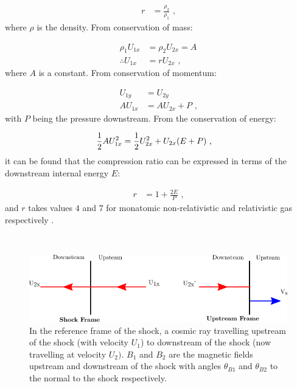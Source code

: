 \begin{equation}
    \begin{aligned}
        r&=\frac{\rho_2}{\rho_1}\text{ ,}
    \end{aligned}
\end{equation}
\noindent where $\rho$ is the density. From conservation of mass:

\begin{equation}
    \begin{aligned}
        \rho_1U_{1x}&=\rho_2U_{2x}=A \\
        \therefore U_{1x}&=rU_{2x}\text{ ,}
    \end{aligned} \label{eq:A3_velocity_ratios}
\end{equation}
\noindent where $A$ is a constant. From conservation of momentum:

\begin{subequations}
    \begin{alignat}{1}
        U_{1y}&=U_{2y} \\
        AU_{1x}&=AU_{2x}+P\text{ ,}
    \end{alignat}
\end{subequations}
\noindent with $P$ being the pressure downstream. From the conservation of energy:

\begin{equation}
    \begin{aligned}
        \frac{1}{2}AU_{1x}^2&=\frac{1}{2}U_{2x}^2+U_{2x}\qty(E+P)\text{ ,}
    \end{aligned}
\end{equation}
\noindent it can be found that the compression ratio can be expressed in terms of the downstream internal energy $E$:

\begin{equation}
    \begin{aligned}
        r&=1+\frac{2E}{P}\text{ ,}
    \end{aligned}
\end{equation}
\noindent and $r$ takes values $4$ and $7$ for monatomic non-relativistic and relativistic gas respectively  \citep{1983RPPh...46..973D}.
\par~\par 
\begin{figure}[h]
	\centering
	\includegraphics[width=1.0\textwidth]{A3_Diffusive_Shock_Acceleration/Images/upstream_downstream.png}
	\caption{In the reference frame of the shock, a cosmic ray travelling upstream of the shock (with velocity $U_1$) to downstream of the shock (now travelling at velocity $U_2)$. $B_1$ and $B_2$ are the magnetic fields upstream and downstream of the shock with angles $\theta_{B1}$ and $\theta_{B2}$ to the normal to the shock respectively.}
	\label{fig:A3_shock_dynamics2}
\end{figure}


